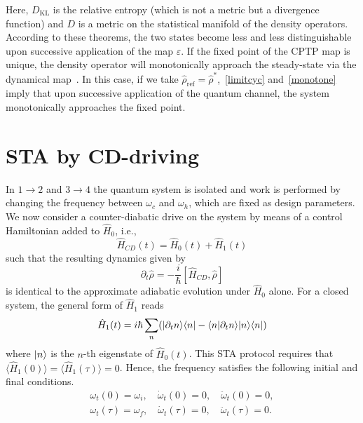 \documentclass[aps,pra,twocolumn,showpacs,showkeys,groupedaddress,nobalancelastpage,nofootinbib,floatfix,superscriptaddress,longbibliography]{revtex4-2}
\begin{document}
Here, $D_{\text{KL}}$ is the relative entropy (which is not a metric but a divergence function) and $D$ is a metric on the statistical manifold of the density operators. According to these theorems, the two states become less and less distinguishable upon successive application of the map $\varepsilon$. If the fixed point of the CPTP map is unique, the density operator will monotonically approach the steady-state via the dynamical map~\cite{Frigerio1977}. In this case, if we take $\hat{\rho}_{\text{ref}}=\hat{\rho}^*$,~\cref{limitcyc} and~\cref{monotone} imply that upon successive application of the quantum channel, the system monotonically approaches the fixed point.

\section{STA by CD-driving}
\label{sec:sta}
In $1\rightarrow 2$ and $3\rightarrow 4$ the quantum system is isolated and work is performed by changing the frequency between $\omega_c$ and $\omega_h$, which are fixed as design parameters. We now consider a counter-diabatic drive on the system by means of a control Hamiltonian added to $\hat{H}_0$, i.e.,
\begin{equation}\label{cd.ham.sta}
\hat{H}_{CD}(t) = \hat{H}_0(t) + \hat{H}_1(t)
\end{equation}
such that the resulting dynamics given by
\begin{equation}\label{eq.mo.sta}
   \partial_t{\hat{\rho}} = -\frac{i}{\hbar}[\hat{H}_{CD},\hat{\rho}]
\end{equation}
is identical to the approximate adiabatic evolution under $\hat{H}_0$ alone. 
For a closed system, the general form of $\hat{H}_1$ reads~\cite{Berry_2009}
\begin{equation}\label{cd.drive.sta}
 \hat{H}_1(t) = i\hbar \sum_n (|\partial_t n\rangle\langle n| - \langle n|\partial_t n\rangle|n\rangle\langle n|)
\end{equation}
where $|n\rangle$ is the $n$-th eigenstate of $\hat{H}_0(t)$. This STA protocol requires that $\langle \hat{H}_1(0)\rangle = \langle \hat{H}_1(\tau)\rangle = 0$. Hence, the frequency satisfies the following initial and final conditions.
\begin{align}\label{bc.sta}
  \omega_t(0)=\omega_i,\quad \dot{\omega}_t(0)=0, \quad \ddot{\omega}_t(0)=0,\nonumber  \\
  \omega_t(\tau)=\omega_f,\quad \dot{\omega}_t(\tau)=0, \quad \ddot{\omega}_t(\tau)=0.
\end{align}
\end{document}
